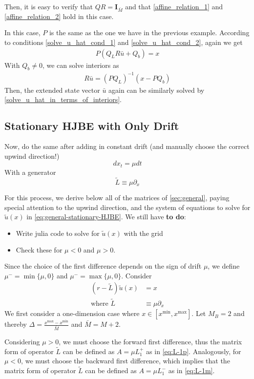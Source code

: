 \documentclass[11pt]{article}
\newcommand{\D}[1][]{\ensuremath{\partial_{#1}}}
\begin{document}
Then, it is easy to verify that $Q  R = \mathbf{I}_{\bar{M}}$ and that \eqref{affine_relation_1} and \eqref{affine_relation_2} hold in this case.

In this case, $P$ is the same as the one we have in the previous example. According to conditions \eqref{solve_u_hat_cond_1} and \eqref{solve_u_hat_cond_2}, again we get
\begin{align}
P(Q_L R \bar{u}+Q_b) = x
\end{align}
With $Q_b\neq 0$, we can solve interiors as
\begin{align}
R\bar{u} = (P Q_L)^{-1}(x-P Q_b)
\end{align}
Then, the extended state vector $\bar{u}$ again can be similarly solved by \eqref{solve_u_hat_in_terms_of_interiors}.
\subsection{Stationary HJBE with Only Drift}
Now, do the same after adding in constant drift (and manually choose the correct upwind direction!)
$$
d x_t = \mu dt
$$
With a generator
$$
	\tilde{L} \equiv \mu \D[x]
$$

For this process, we derive below all of the matrices of \cref{sec:general}, paying special attention to the upwind direction, and the system of equations to solve for $\tilde{u}(x)$ in \cref{eq:general-stationary-HJBE}. We still have \textbf{to do}:
\begin{itemize}
	\item Write julia code to solve for $\tilde{u}(x)$ with the grid
	\item Check these for $\mu < 0$ and $\mu > 0$.
\end{itemize}

Since the choice of the first difference depends on the sign of drift $\mu$, we define $\mu^- =\min\{\mu, 0\}$ and $\mu^- =\max\{\mu, 0\}$.
Consider
\begin{align}
(r - \tilde{L} )\tilde{u}(x) &= x\label{HJBE_PDE_with_drifts}\\
\text{where }\tilde{L}&\equiv \mu\partial_{x}
\end{align}
We first consider a one-dimension case where $x\in [x^{\min},x^{\max}]$. Let $M_B = 2$ and thereby $\Delta  = \frac{x^{\max}-x^{\min}}{\bar{M}}$ and $\bar{M} = M+2$.

Considering $\mu>0$, we must choose the forward first difference, thus the matrix form of operator $\tilde{L}$ can be defined as $A = \mu L_1^+$ as in \eqref{eq:L-1p}. Analogously, for $\mu<0$, we must choose the backward first difference, which implies that the matrix form of operator $\tilde{L}$ can be defined as $A = \mu L_1^-$ as in \eqref{eq:L-1m}.
\end{document}
